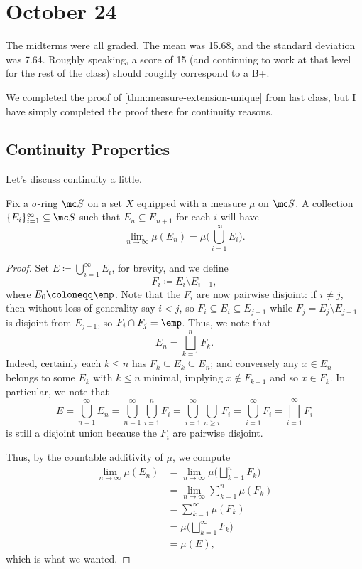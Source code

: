 \documentclass[../notes.tex]{subfiles}
\begin{document}
\section{October 24}

The midterms were all graded. The mean was 15.68, and the standard deviation was 7.64. Roughly speaking, a score of 15 (and continuing to work at that level for the rest of the class) should roughly correspond to a B+.

We completed the proof of \autoref{thm:measure-extension-unique} from last class, but I have simply completed the proof there for continuity reasons.

\subsection{Continuity Properties}
Let's discuss continuity a little.
\begin{proposition} \label{prop:measure-union-up}
	Fix a $\sigma$-ring $\mc S$ on a set $X$ equipped with a measure $\mu$ on $\mc S$. A collection $\{E_i\}_{i=1}^\infty\subseteq\mc S$ such that $E_n\subseteq E_{n+1}$ for each $i$ will have
	\[\lim_{n\to\infty}\mu(E_n)=\mu\Bigg(\bigcup_{i=1}^\infty E_i\Bigg).\]
\end{proposition}
\begin{proof}
	Set $E\coloneqq\bigcup_{i=1}^\infty E_i$, for brevity, and we define
	\[F_i\coloneqq E_i\setminus E_{i-1},\]
	where $E_0\coloneqq\emp$. Note that the $F_i$ are now pairwise disjoint: if $i\ne j$, then without loss of generality say $i<j$, so $F_i\subseteq E_i\subseteq E_{j-1}$ while $F_j=E_j\setminus E_{j-1}$ is disjoint from $E_{j-1}$, so $F_i\cap F_j=\emp$. Thus, we note that
	\[E_n=\bigsqcup_{k=1}^nF_k.\]
	Indeed, certainly each $k\le n$ has $F_k\subseteq E_k\subseteq E_n$; and conversely any $x\in E_n$ belongs to some $E_k$ with $k\le n$ minimal, implying $x\notin F_{k-1}$ and so $x\in F_k$. In particular, we note that
	\[E=\bigcup_{n=1}^\infty E_n=\bigcup_{n=1}^\infty\bigcup_{i=1}^nF_i=\bigcup_{i=1}^\infty\bigcup_{n\ge i} F_i=\bigcup_{i=1}^\infty F_i=\bigsqcup_{i=1}^\infty F_i\]
	is still a disjoint union because the $F_i$ are pairwise disjoint.

	Thus, by the countable additivity of $\mu$, we compute
	\begin{align*}
		\lim_{n\to\infty}\mu(E_n) &= \lim_{n\to\infty}\mu\Bigg(\bigsqcup_{k=1}^nF_k\Bigg) \\
		&= \lim_{n\to\infty}\sum_{k=1}^n\mu(F_k) \\
		&= \sum_{k=1}^\infty\mu(F_k) \\
		&= \mu\Bigg(\bigsqcup_{k=1}^\infty F_k\Bigg) \\
		&= \mu(E),
	\end{align*}
	which is what we wanted.
\end{proof}
\end{document}

